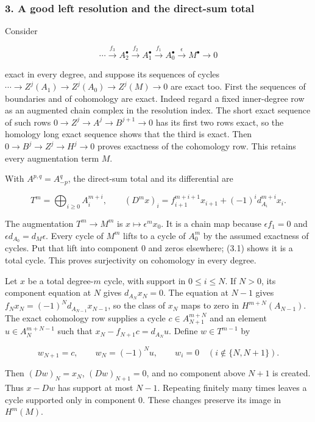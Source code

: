 \subsubsection{3. A good left resolution and the direct-sum total}\label{a-good-left-resolution-and-the-direct-sum-total}

Consider

\[
\cdots\xrightarrow{f_3}A_2^\bullet\xrightarrow{f_2}A_1^\bullet
\xrightarrow{f_1}A_0^\bullet\xrightarrow{\epsilon}M^\bullet\to0
\]

exact in every degree, and suppose its sequences of cycles \(\cdots\to Z^j(A_1)\to Z^j(A_0)\to Z^j(M)\to0\) are exact too. First the sequences of boundaries and of cohomology are exact. Indeed regard a fixed inner-degree row as an augmented chain complex in the resolution index. The short exact sequence of such rows \(0\to Z^j\to A^j\to B^{j+1}\to0\) has its first two rows exact, so the homology long exact sequence shows that the third is exact. Then \(0\to B^j\to Z^j\to H^j\to0\) proves exactness of the cohomology row. This retains every augmentation term \(M\).

With \(A^{p,q}=A_{-p}^q\), the direct-sum total and its differential are

\[
T^m=\bigoplus_{i\geq0}A_i^{m+i},\qquad
(D^mx)_i=f_{i+1}^{m+i+1}x_{i+1}+(-1)^i d_{A_i}^{m+i}x_i.       \tag{3.1}
\]

The augmentation \(T^m\to M^m\) is \(x\mapsto\epsilon^m x_0\). It is a chain map because \(\epsilon f_1=0\) and \(\epsilon d_{A_0}=d_M\epsilon\). Every cycle of \(M^m\) lifts to a cycle of \(A_0^m\) by the assumed exactness of cycles. Put that lift into component 0 and zeros elsewhere; (3.1) shows it is a total cycle. This proves surjectivity on cohomology in every degree.

Let \(x\) be a total degree-\(m\) cycle, with support in \(0\leq i\leq N\). If \(N>0\), its component equation at \(N\) gives \(d_{A_N}x_N=0\). The equation at \(N-1\) gives \(f_Nx_N=(-1)^N d_{A_{N-1}}x_{N-1}\), so the class of \(x_N\) maps to zero in \(H^{m+N}(A_{N-1})\). The exact cohomology row supplies a cycle \(c\in A_{N+1}^{m+N}\) and an element \(u\in A_N^{m+N-1}\) such that \(x_N-f_{N+1}c=d_{A_N}u\). Define \(w\in T^{m-1}\) by

\[
w_{N+1}=c,\qquad w_N=(-1)^N u,
\qquad w_i=0\quad(i\notin\{N,N+1\}).
\]

Then \((Dw)_N=x_N\), \((Dw)_{N+1}=0\), and no component above \(N+1\) is created. Thus \(x-Dw\) has support at most \(N-1\). Repeating finitely many times leaves a cycle supported only in component 0. These changes preserve its image in \(H^m(M)\).

